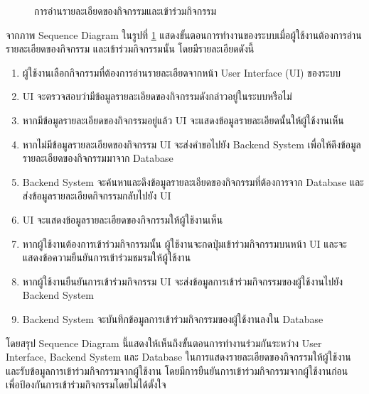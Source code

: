 \documentclass[14pt,oneside,openright,a4paper]{cpe-thai-project}
\begin{document}
  \begin{figure}[!h]\centering
    \setlength{\fboxrule}{0.5mm} %
    \setlength{\fboxsep}{0.5cm}
    \caption{การอ่านรายละเอียดของกิจกรรมและเข้าร่วมกิจกรรม}\label{fig:Select and join event}
  \end{figure}

  จากภาพ Sequence Diagram ในรูปที่ \ref{fig:Select and join event} แสดงขั้นตอนการทำงานของระบบเมื่อผู้ใช้งานต้องการอ่านรายละเอียดของกิจกรรม และเข้าร่วมกิจกรรมนั้น โดยมีรายละเอียดดังนี้
  \begin{enumerate}
    \item ผู้ใช้งานเลือกกิจกรรมที่ต้องการอ่านรายละเอียดจากหน้า User Interface (UI) ของระบบ
    \item UI จะตรวจสอบว่ามีข้อมูลรายละเอียดของกิจกรรมดังกล่าวอยู่ในระบบหรือไม่
    \item หากมีข้อมูลรายละเอียดของกิจกรรมอยู่แล้ว UI จะแสดงข้อมูลรายละเอียดนั้นให้ผู้ใช้งานเห็น
    \item หากไม่มีข้อมูลรายละเอียดของกิจกรรม UI จะส่งคำขอไปยัง Backend System เพื่อให้ดึงข้อมูลรายละเอียดของกิจกรรมมาจาก Database
    \item Backend System จะค้นหาและดึงข้อมูลรายละเอียดของกิจกรรมที่ต้องการจาก Database และส่งข้อมูลรายละเอียดกิจกรรมกลับไปยัง UI
    \item UI จะแสดงข้อมูลรายละเอียดของกิจกรรมให้ผู้ใช้งานเห็น
    \item หากผู้ใช้งานต้องการเข้าร่วมกิจกรรมนั้น ผู้ใช้งานจะกดปุ่มเข้าร่วมกิจกรรมบนหน้า UI และจะแสดงข้อความยืนยันการเข้าร่วมชมรมให้ผู้ใช้งาน
    \item หากผู้ใช้งานยืนยันการเข้าร่วมกิจกรรม UI จะส่งข้อมูลการเข้าร่วมกิจกรรมของผู้ใช้งานไปยัง Backend System
    \item Backend System จะบันทึกข้อมูลการเข้าร่วมกิจกรรมของผู้ใช้งานลงใน Database
  \end{enumerate}
  โดยสรุป Sequence Diagram นี้แสดงให้เห็นถึงขั้นตอนการทำงานร่วมกันระหว่าง User Interface, Backend System และ Database ในการแสดงรายละเอียดของกิจกรรมให้ผู้ใช้งาน และรับข้อมูลการเข้าร่วมกิจกรรมจากผู้ใช้งาน โดยมีการยืนยันการเข้าร่วมกิจกรรมจากผู้ใช้งานก่อน เพื่อป้องกันการเข้าร่วมกิจกรรมโดยไม่ได้ตั้งใจ
\end{document}
